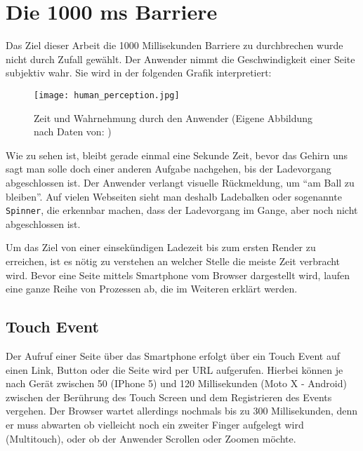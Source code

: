 
\pagebreak
%
%


\section{Die 1000 ms Barriere} %
\label{sec:die_1000_ms_barriere}
	Das Ziel dieser Arbeit die 1000 Millisekunden Barriere zu durchbrechen wurde nicht durch Zufall gewählt. Der Anwender nimmt die Geschwindigkeit einer Seite subjektiv wahr. Sie wird in der folgenden Grafik interpretiert:

	\begin{figure}[htbp]
		\begin{center}
			\texttt{[image: human\_perception.jpg]}
			\caption{Zeit und Wahrnehmung durch den Anwender (Eigene Abbildung nach Daten von: \autocite{grigorikHumanPerception})}
			\label{fig:human_perception}
		\end{center}
	\end{figure}

	Wie zu sehen ist, bleibt gerade einmal eine Sekunde Zeit, bevor das Gehirn uns sagt man solle doch einer anderen Aufgabe nachgehen, bis der Ladevorgang abgeschlossen ist. Der Anwender verlangt visuelle Rückmeldung, um "`am Ball zu bleiben"'. Auf vielen Webseiten sieht man deshalb Ladebalken oder sogenannte \texttt{Spinner}, die erkennbar machen, dass der Ladevorgang im Gange, aber noch nicht abgeschlossen ist.

	Um das Ziel von einer einsekündigen Ladezeit bis zum ersten Render zu erreichen, ist es nötig zu verstehen an welcher Stelle die meiste Zeit verbracht wird. Bevor eine Seite mittels Smartphone vom Browser dargestellt wird, laufen eine ganze Reihe von Prozessen ab, die im Weiteren erklärt werden.



	\subsection{Touch Event} %
	\label{sub:touch_event}
		Der Aufruf einer Seite über das Smartphone erfolgt über ein Touch Event auf einen Link, Button oder die Seite wird per URL aufgerufen. Hierbei können je nach Gerät zwischen 50 (IPhone 5) und 120 Millisekunden (Moto X - Android) zwischen der Berührung des Touch Screen und dem Registrieren des Events vergehen.\autocite{venturebeat} Der Browser wartet allerdings nochmals bis zu 300 Millisekunden, denn er muss abwarten ob vielleicht noch ein zweiter Finger aufgelegt wird (Multitouch), oder ob der Anwender Scrollen oder Zoomen möchte.\autocite{google11}

